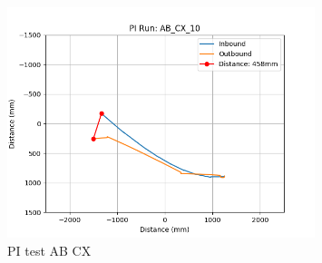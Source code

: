 \documentclass[a4paper,11pt,twoside,openright]{article}
\begin{document}
\begin{figure}[h!]
  \centering
  \includegraphics[width=0.8\textwidth]{AB_CX_10}
  \caption{\label{fig:abcx10} PI test AB\textunderscore
    CX}
\end{figure}
\end{document}
